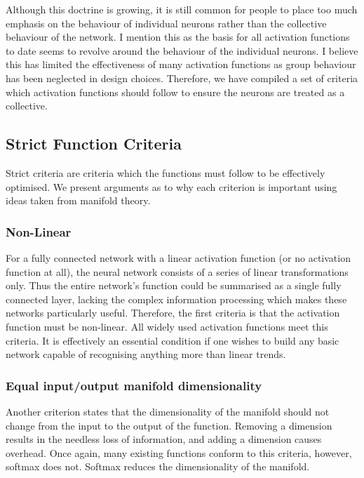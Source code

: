 \documentclass[onecolumn]{article}
\begin{document}
        
    Although this doctrine is growing, it is still common for people to place too much emphasis on the behaviour of individual neurons rather than the collective behaviour of the network. I mention this as the basis for all activation functions to date seems to revolve around the behaviour of the individual neurons. I believe this has limited the effectiveness of many activation functions as group behaviour has been neglected in design choices. Therefore, we have compiled a set of criteria which activation functions should follow to ensure the neurons are treated as a collective.
    
    \subsection{Strict Function Criteria}
    
    Strict criteria are criteria which the functions must follow to be effectively optimised. We present arguments as to why each criterion is important using ideas taken from manifold theory.
   
    \subsubsection{Non-Linear}
        
    For a fully connected network with a linear activation function (or no activation function at all), the neural network consists of a series of linear transformations only. Thus the entire network's function could be summarised as a single fully connected layer, lacking the complex information processing which makes these networks particularly useful. Therefore, the first criteria is that the activation function must be non-linear. All widely used activation functions meet this criteria. It is effectively an essential condition if one wishes to build any basic network capable of recognising anything more than linear trends.
    
        
    \subsubsection{Equal input/output manifold dimensionality}
       
    Another criterion states that the dimensionality of the manifold should not change from the input to the output of the function. Removing a dimension results in the needless loss of information, and adding a dimension causes overhead. Once again, many existing functions conform to this criteria, however, softmax does not. Softmax reduces the dimensionality of the manifold.
    
\end{document}
